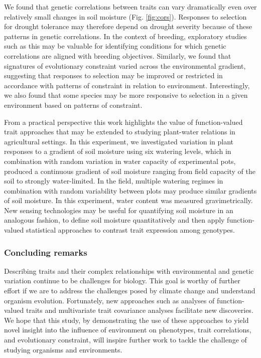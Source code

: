 \documentclass[jou,floatsintext]{apa6}
\begin{document}
We found that genetic correlations between traits can vary dramatically even over relatively small changes in soil moisture (Fig. \ref{fig:cors}). Responses to selection for drought tolerance may therefore depend on drought severity because of these patterns in genetic correlations. In the context of breeding, exploratory studies such as this may be valuable for identifying conditions for which genetic correlations are aligned with breeding objectives. Similarly, we found that signatures of evolutionary constraint varied across the environmental gradient, suggesting that responses to selection may be improved or restricted in accordance with patterns of constraint in relation to environment. Interestingly, we also found that some species may be more responsive to selection in a given environment based on patterns of constraint.

From a practical perspective this work highlights the value of function-valued trait approaches that may be extended to studying plant-water relations in agricultural settings. In this experiment, we investigated variation in plant responses to a gradient of soil moisture using six watering levels, which in combination with random variation in water capacity of experimental pots, produced a continuous gradient of soil moisture ranging from field capacity of the soil to strongly water-limited. In the field, multiple watering regimes in combination with random variability between plots may produce similar gradients of soil moisture. In this experiment, water content was measured gravimetrically. New sensing technologies may be useful for quantifying soil moisture in an analogous fashion, to define soil moisture quantitatively and then apply function-valued statistical approaches to contrast trait expression among genotypes.

\hypertarget{concluding-remarks}{%
\subsubsection{Concluding remarks}\label{concluding-remarks}}

Describing traits and their complex relationships with environmental and genetic variation continue to be challenges for biology. This goal is worthy of further effort if we are to address the challenges posed by climate change and understand organism evolution. Fortunately, new approaches such as analyses of function-valued traits and multivariate trait covariance analyses facilitate new discoveries. We hope that this study, by demonstrating the use of these approaches to yield novel insight into the influence of environment on phenotypes, trait correlations, and evolutionary constraint, will inspire further work to tackle the challenge of studying organisms and environments.
\end{document}
